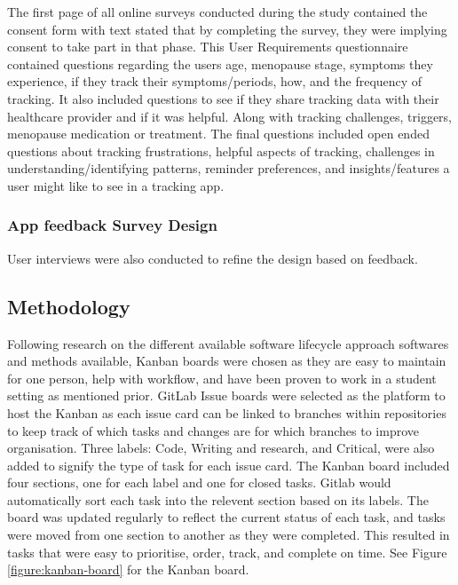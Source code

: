 The first page of all online surveys conducted during the study contained the consent form with text stated that by completing the survey, they were implying consent to take part in that phase. This User Requirements questionnaire contained questions regarding the users age, menopause stage, symptoms they experience, if they track their symptoms/periods, how, and the frequency of tracking. It also included questions to see if they share tracking data with their healthcare provider and if it was helpful. Along with tracking challenges, triggers, menopause medication or treatment. The final questions included open ended questions about tracking frustrations, helpful aspects of tracking, challenges in understanding/identifying patterns, reminder preferences, and insights/features a user might like to see in a tracking app. 

\subsubsection{App feedback Survey Design} 
User interviews were also conducted to refine the design based on feedback. 


\subsection{Methodology}
Following research on the different available software lifecycle approach softwares and methods available, Kanban boards were chosen as they are easy to maintain for one person, help with workflow, and have been proven to work in a student setting as mentioned prior. GitLab Issue boards were selected as the platform to host the Kanban as each issue card can be linked to branches within repositories to keep track of which tasks and changes are for which branches to improve organisation. Three labels: Code, Writing and research, and Critical, were also added to signify the type of task for each issue card. The Kanban board included four sections, one for each label and one for closed tasks. Gitlab would automatically sort each task into the relevent section based on its labels. The board was updated regularly to reflect the current status of each task, and tasks were moved from one section to another as they were completed. This resulted in tasks that were easy to prioritise, order, track, and complete on time. See Figure \ref{figure:kanban-board} for the Kanban board.

